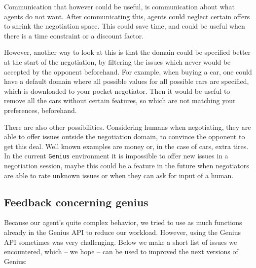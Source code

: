 Communication that however could be useful, is communication about what agents do not want. After communicating this, agents could neglect certain offers to shrink the negotiation space. This could save time, and could be useful when there is a time constraint or a discount factor. 

However, another way to look at this is that the domain could be specified better at the start of the negotiation, by filtering the issues which never would be accepted by the opponent beforehand. For example, when buying a car, one could have a default domain where all possible values for all possible cars are specified, which is 
downloaded to your pocket negotiator. Then it would be useful to remove all the cars without certain features, so which are not matching your preferences, beforehand. 

There are also other possibilities. Considering humans when negotiating, they are able to offer issues outside the negotiation domain, to convince the opponent to get this deal. Well known examples are money or, in the case of cars, extra tires. In the current \texttt{Genius} environment it is impossible to offer new issues in a negotiation session, maybe this could be a feature in the future when negotiators are able to rate unknown issues or when they can ask for input of a human. 

\subsection{Feedback concerning genius}
\label{sec:genius}

Because our agent's quite complex behavior, we tried to use as much functions
already in the Genius API to reduce our workload. However, using the Genius API 
sometimes was very challenging. Below we make a short list of issues we encountered,
which -- we hope -- can be used to improved the next versions of Genius:

